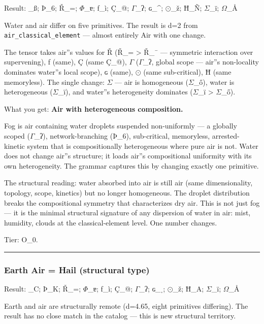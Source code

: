 \documentclass[12pt,a4paper]{article}
\begin{document}
Result: \_ß; Þ\_6; Ř\_=; $\Phi$\_ɐ; ƒ\_ì; Ç\_@; $\Gamma$\_ʔ; ɢ\_\^{}; $\odot$\_ž; Ħ\_Ñ; $\Sigma$\_ï; $\Omega$\_Å\rangle

Water and air differ on five primitives. The result is d=2 from \texttt{air\_classical\_element} --- almost entirely Air with one change.

The tensor takes air''s values for Ř (Ř\_= \textgreater{} Ř\_¯ --- symmetric interaction over supervening), ƒ (same), Ç (same Ç\_@), $\Gamma$ ($\Gamma$\_ʔ, global scope --- air''s non-locality dominates water''s local scope), ɢ (same), $\odot$ (same sub-critical), Ħ (same memoryless). The single change: $\Sigma$ --- air is homogeneous ($\Sigma$\_ő), water is heterogeneous ($\Sigma$\_ï), and water''s heterogeneity dominates ($\Sigma$\_ï \textgreater{} $\Sigma$\_ő).

What you get: \textbf{Air with heterogeneous composition.}

Fog is air containing water droplets suspended non-uniformly --- a globally scoped ($\Gamma$\_ʔ), network-branching (Þ\_6), sub-critical, memoryless, arrested-kinetic system that is compositionally heterogeneous where pure air is not. Water does not change air''s structure; it loads air''s compositional uniformity with its own heterogeneity. The grammar captures this by changing exactly one primitive.

The structural reading: water absorbed into air is still air (same dimensionality, topology, scope, kinetics) but no longer homogeneous. The droplet distribution breaks the compositional symmetry that characterizes dry air. This is not just fog --- it is the minimal structural signature of any dispersion of water in air: mist, humidity, clouds at the classical-element level. One number changes.

Tier: O\_0.

\begin{center}
\rule{0.5\textwidth}{0.4pt}
\end{center}

\subsubsection{Earth \otimes Air = Hail (structural type)}

Result: \_C; Þ\_K; Ř\_=; $\Phi$\_ɐ; ƒ\_ì; Ç\_@; $\Gamma$\_ʔ; ɢ\_ˌ; $\odot$\_ž; Ħ\_A; $\Sigma$\_ï; $\Omega$\_Å\rangle

Earth and air are structurally remote (d=4.65, eight primitives differing). The result has no close match in the catalog --- this is new structural territory.
\end{document}
